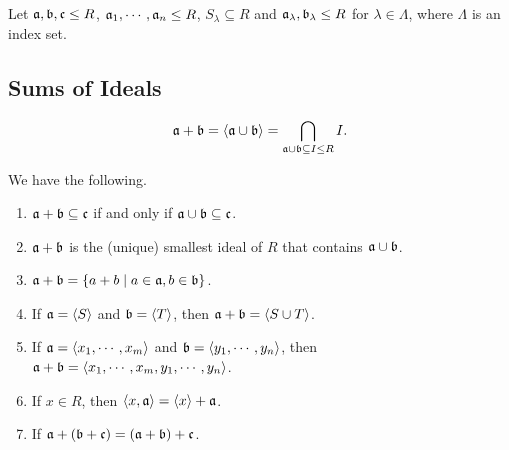 Let $\mathfrak{a},\mathfrak{b},\mathfrak{c} \leq R$, $\mathfrak{a}_1,\cdots,\mathfrak{a}_n \leq R$, $S_\lambda \subseteq R$ and $\mathfrak{a}_\lambda,\mathfrak{b}_\lambda \leq R$ for $\lambda \in \Lambda$, where $\Lambda$ is an index set.

\subsection*{Sums of Ideals}

\begin{definition}\label{1.30}
    \[\mathfrak{a} + \mathfrak{b} = \langle \mathfrak{a} \cup \mathfrak{b} \rangle = \bigcap_{\mathfrak{a} \cup \mathfrak{b} \subseteq I \leq R}I.\]
\end{definition}

\begin{fact}\label{1.31}
    We have the following.
    \begin{enumerate}
        \item\label{1.31a} $\mathfrak{a} + \mathfrak{b} \subseteq \mathfrak{c}$ if and only if $\mathfrak{a} \cup \mathfrak{b} \subseteq \mathfrak{c}$.
        \item\label{1.31b} $\mathfrak{a} + \mathfrak{b}$ is the (unique) smallest ideal of $R$ that contains $\mathfrak{a} \cup \mathfrak{b}$.
        \item\label{1.31c} $\mathfrak{a} + \mathfrak{b} = \{a + b \mid a \in \mathfrak{a}, b \in \mathfrak{b}\}$.
        \item\label{1.31d} If $\mathfrak{a} = \langle S \rangle$ and $\mathfrak{b} = \langle T \rangle$, then $\mathfrak{a} + \mathfrak{b} = \langle S \cup T \rangle$.
        \item\label{1.31e} If $\mathfrak{a} = \langle x_1,\cdots,x_m \rangle$ and $\mathfrak{b} = \langle y_1,\cdots,y_n \rangle$, then $\mathfrak{a} + \mathfrak{b} = \langle x_1,\cdots,x_m, y_1,\cdots,y_n \rangle$.
        \item\label{1.31f} If $x \in R$, then $\langle x,\mathfrak{a} \rangle = \langle x \rangle + \mathfrak{a}$.
        \item\label{1.31g} If $\mathfrak{a} + (\mathfrak{b} + \mathfrak{c}) = (\mathfrak{a} + \mathfrak{b}) + \mathfrak{c}$.
    \end{enumerate}
\end{fact}

